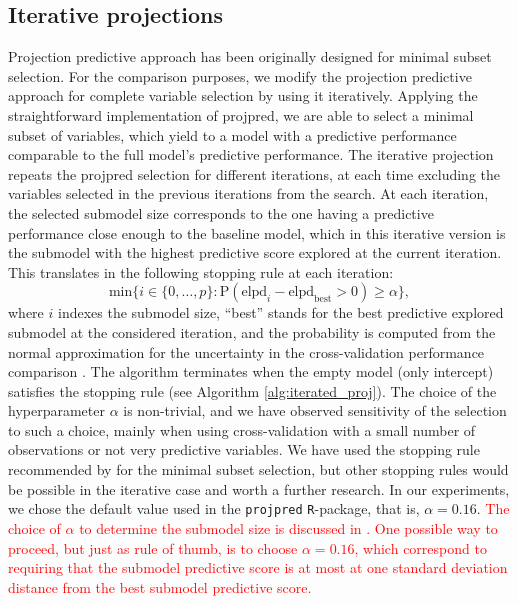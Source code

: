 \documentclass[a4]{article}
\theoremstyle{definition}
\newcommand{\fede}[1]{\textcolor{red}{#1}}
\begin{document}
\subsection{Iterative projections}

Projection predictive approach has been originally designed for minimal subset selection. For the comparison purposes, 
we modify the projection predictive approach for complete variable
selection by using it iteratively.  Applying the straightforward
implementation of projpred, we are able to select a minimal subset of
variables, which yield to a model with a predictive performance
comparable to the full model's predictive performance. 
 The iterative projection repeats
the projpred selection for different iterations, at each time
excluding the variables selected in the previous
iterations from the search.
 At each iteration, the selected submodel size corresponds to the
one having a predictive performance close enough to the baseline
model, which in this iterative version is the submodel with the
highest predictive score explored at the current iteration. This translates
in the following stopping rule at each iteration:
\begin{equation} 
\label{eq:rule_of_thumb}
\text{min} \{i\in \{0,\ldots,p\}: \text{P}(\text{elpd}_{i}-\text{elpd}_{\text{best}}>0)\geq \alpha \},
\end{equation}
where $i$ indexes the submodel size, ``best'' stands for the best predictive explored submodel
at the considered iteration, and the probability is computed from the normal approximation for the uncertainty in the cross-validation performance comparison \citep{Vehtari+etal:2017:practical,paper:projpred,Sivula+etal:2020:loo_uncertainty}. The algorithm terminates when the empty model (only intercept) satisfies
the stopping rule (see Algorithm \ref{alg:iterated_proj}).
The choice of the hyperparameter $\alpha$ is non-trivial, and we have 
observed sensitivity of the selection to such a choice, mainly when using cross-validation with a small
number of observations or not very predictive variables. We have used the stopping rule recommended by \citet{paper:projpred} for the minimal subset selection, but other stopping rules would be possible in the iterative case and worth a further research.
In our experiments, we chose the default value used in the \texttt{projpred} 
\texttt{R}-package, that is, $\alpha=0.16$. \fede{The choice of $\alpha$ to determine 
the submodel size is discussed in \cite{paper:projpred}. One possible way to proceed, 
but just as rule of thumb, is to choose $\alpha = 0.16$, which correspond to requiring 
that the submodel predictive score is at most at one standard deviation distance 
from the best submodel predictive score.}
\end{document}

